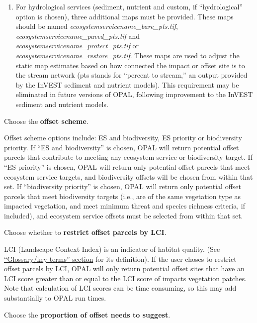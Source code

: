 \documentclass[11pt,letterpaper]{report}
\newenvironment{myenumerate}{%
	\edef\backupindent{\the\parindent}
	\enumerate
	\setlength{\parindent}{\backupindent}
		\setlist[enumerate,1]{label=(\arabic*)}
		\setlist[enumerate,2]{label=(\arabic*)}
}{\endenumerate}
\begin{document}
\begin{myenumerate}
\begin{enumerate}[label=\alph*.]
\begin{enumerate}[label=(\arabic*),leftmargin=0.5in,labelindent=!,itemindent=-0.02in]
					\item For hydrological services (sediment, nutrient and custom, if ``hydrological'' option is chosen), three additional maps must be provided. These maps should be named {\em ecosystemservicename\_{}bare\_{}pts.tif}, {\em ecosystemservicename\_{}paved\_{}pts.tif} and {\em ecosystemservicename\_{}protect\_{}pts.tif} or {\em ecosystemservicename\_{}restore\_{}pts.tif}. These maps are used to adjust the static map estimates based on how connected the impact or offset site is to the stream network (pts stands for ``percent to stream,'' an output provided by the InVEST sediment and nutrient models). This requirement may be eliminated in future versions of OPAL, following improvement to the InVEST sediment and nutrient models.
					
				\end{enumerate}
				
			\end{enumerate}	
		
		\item Choose the \textbf{offset scheme}.
		
			Offset scheme options include: ES and biodiversity, ES priority or biodiversity priority. If ``ES and biodiversity'' is chosen, OPAL will return potential offset parcels that contribute to meeting any ecosystem service or biodiversity target. If ``ES priority'' is chosen, OPAL will return only potential offset parcels that meet ecosystem service targets, and biodiversity offsets will be chosen from within that set. If ``biodiversity priority'' is chosen, OPAL will return only potential offset parcels that meet biodiversity targets (i.e., are of the same vegetation type as impacted vegetation, and meet minimum threat and species richness criteria, if included), and ecosystem service offsets must be selected from within that set.
		
		\item Choose whether to \textbf{restrict offset parcels by LCI}.
		
			LCI (Landscape Context Index) is an indicator of habitat quality. (See \hyperref[ch:glossary]{``Glossary/key terms'' section} for its definition). If the user choses to restrict offset parcels by LCI, OPAL will only return potential offset sites that have an LCI score greater than or equal to the LCI score of impacts vegetation patches. Note that calculation of LCI scores can be time consuming, so this may add substantially to OPAL run times.
		
		\item Choose the \textbf{proportion of offset needs to suggest}.
		

\end{myenumerate}
\end{document}
